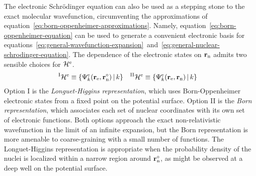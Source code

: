 \documentclass[11pt]{article}
\begin{document}
\begin{rmk}
\label{rmk:born-and-longuet-higgins-representations}
The electronic Schr\"odinger equation can also be used as a stepping stone to the exact molecular wavefunction, circumventing the approximations of equation~\ref{eq:born-oppenheimer-approximations}.
Namely, equation~\ref{eq:born-oppenheimer-equation} can be used to generate a convenient electronic basis for equations~\ref{eq:general-wavefunction-expansion}~and~\ref{eq:general-nuclear-schrodinger-equation}.
The dependence of the electronic states on $\mathbf{r}_{\mathrm{n}}$ admits two sensible choices for $\mathcal{H}^{\mathrm{e}}$.
\begin{align}
  {}^{\mathrm{I}}\mathcal{H}^{\mathrm{e}}
\equiv
  \{
    \Psi _k^{\mathrm{e}}(\mathbf{r}_{\mathrm{e}},\mathbf{r}_{\mathrm{n}}^\circ)
  \,|\,
    k
  \}
&&
  {}^{\mathrm{II}}\mathcal{H}^{\mathrm{e}}
\equiv
  \{
    \Psi _k^{\mathrm{e}}(\mathbf{r}_{\mathrm{e}},\mathbf{r}_{\mathrm{n}})
  \,|\,
    k
  \}
\end{align}
Option I is the \textit{Longuet-Higgins representation}, which uses Born-Oppenheimer electronic states from a fixed point on the potential surface.
Option II is the \textit{Born representation}, which associates each set of nuclear coordinates with its own set of electronic functions.
Both options approach the exact non-relativistic wavefunction in the limit of an infinite expansion, but the Born representation is more amenable to coarse-graining with a small number of functions.
The Longuet-Higgins representation is appropriate when the probability density of the nuclei is localized within a narrow region around $\mathbf{r}_{\mathrm{n}}^\circ$,
as might be observed at a deep well on the potential surface.
\end{rmk}
\end{document}
